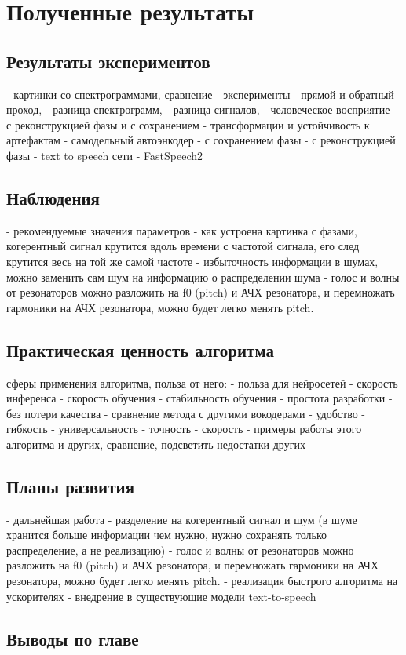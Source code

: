 \chapter{Полученные результаты}

\section{Результаты экспериментов}
\begin{markdown}
  - картинки со спектрограммами, сравнение
  - эксперименты
   - прямой и обратный проход, 
     - разница спектрограмм, 
     - разница сигналов, 
     - человеческое восприятие
     - с реконструкцией фазы и с сохранением
     - трансформации и устойчивость к артефактам
   - самодельный автоэнкодер 
     - с сохранением фазы
	 - с реконструкцией фазы
   - text to speech сети
     - FastSpeech2
\end{markdown}

\section{Наблюдения}
\begin{markdown}
  - рекомендуемые значения параметров
  - как устроена картинка с фазами, когерентный сигнал крутится вдоль времени с частотой сигнала, его след крутится весь на той же самой частоте
  - избыточность информации в шумах, можно заменить сам шум на информацию о распределении шума
  - голос и волны от резонаторов можно разложить на f0 (pitch) и АЧХ резонатора, и перемножать гармоники на АЧХ резонатора, можно будет легко менять pitch.
\end{markdown}

\section{Практическая ценность алгоритма}
\begin{markdown}
   сферы применения алгоритма, польза от него:
    - польза для нейросетей
      - скорость инференса
      - скорость обучения
      - стабильность обучения
      - простота разработки
      - без потери качества
  - сравнение метода с другими вокодерами
    - удобство
    - гибкость
    - универсальность
    - точность
    - скорость
  - примеры работы этого алгоритма и других, сравнение, подсветить недостатки других
\end{markdown}

\section{Планы развития}
\begin{markdown}
 - дальнейшая работа
   - разделение на когерентный сигнал и шум (в шуме хранится больше информации чем нужно, нужно сохранять только распределение, а не реализацию)
   - голос и волны от резонаторов можно разложить на f0 (pitch) и АЧХ резонатора, и перемножать гармоники на АЧХ резонатора, можно будет легко менять pitch.
   - реализация быстрого алгоритма на ускорителях
   - внедрение в существующие модели text-to-speech
\end{markdown}

\section{Выводы по главе}